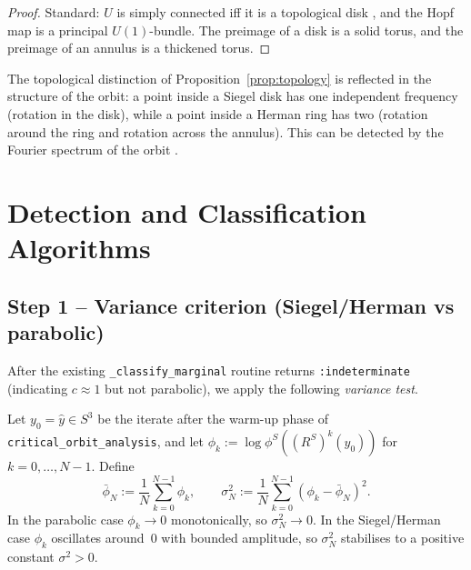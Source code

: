 \documentclass[12pt,a4paper]{article}
\newcommand{\Sthree}{S^3}
\newcommand{\RS}{R^S}         %
\begin{document}
\begin{proof}
  Standard: $U$ is simply connected iff it is a topological disk
  \cite{Milnor2006}, and the Hopf map is a principal $U(1)$-bundle.
  The preimage of a disk is a solid torus, and the preimage of an annulus
  is a thickened torus.
\end{proof}

The topological distinction of Proposition~\ref{prop:topology} is
reflected in the structure of the orbit: a point inside a Siegel disk has
one independent frequency (rotation in the disk), while a point inside a
Herman ring has two (rotation around the ring and rotation across the annulus).
This can be detected by the Fourier spectrum of the orbit
\cite{Laskar1993,LuqueVillanueva2014}.

\section{Detection and Classification Algorithms}
\label{sec:algorithms}

\subsection{Step 1 -- Variance criterion (Siegel/Herman vs parabolic)}
\label{ssec:variance}

After the existing \texttt{\_classify\_marginal} routine returns
\texttt{:indeterminate} (indicating $c\approx 1$ but not parabolic), we
apply the following \emph{variance test}.

Let $y_0 = \hat{y}\in\Sthree$ be the iterate after the warm-up phase of
\texttt{critical\_orbit\_analysis}, and let
$\phi_k := \log\phi^S((\RS)^k(y_0))$ for $k = 0,\ldots,N-1$.
Define
\begin{equation}\label{eq:variance}
  \bar\phi_N := \frac{1}{N}\sum_{k=0}^{N-1}\phi_k,\qquad
  \sigma^2_N := \frac{1}{N}\sum_{k=0}^{N-1}(\phi_k - \bar\phi_N)^2.
\end{equation}
In the parabolic case $\phi_k\to 0$ monotonically, so $\sigma^2_N\to 0$.
In the Siegel/Herman case $\phi_k$ oscillates around~$0$ with bounded
amplitude, so $\sigma^2_N$ stabilises to a positive constant $\sigma^2>0$.
\end{document}
